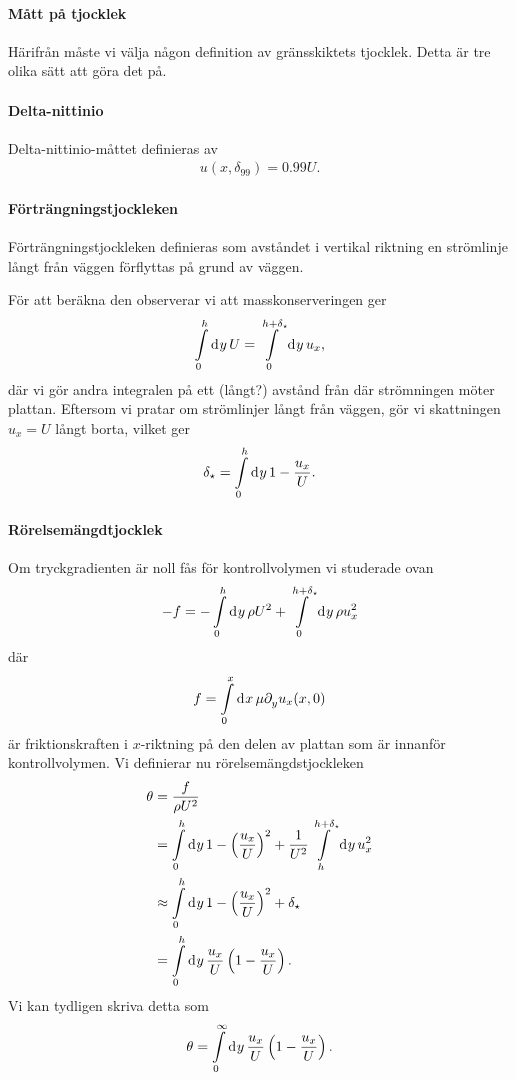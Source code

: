 \paragraph{Mått på tjocklek}
Härifrån måste vi välja någon definition av gränsskiktets tjocklek. Detta är tre olika sätt att göra det på.

\paragraph{Delta-nittinio}
Delta-nittinio-måttet definieras av
\begin{align*}
	u(x, \delta_{99}) = 0.99U.
\end{align*}

\paragraph{Förträngningstjockleken}
Förträngningstjockleken definieras som avståndet i vertikal riktning en strömlinje långt från väggen förflyttas på grund av väggen.

För att beräkna den observerar vi att masskonserveringen ger
\begin{align*}
	\int\limits_{0}^{h}\dd[]{y}U = \int\limits_{0}^{h + \delta_{\star}}\dd[]{y}u_{x},
\end{align*}
där vi gör andra integralen på ett (långt?) avstånd från där strömningen möter plattan. Eftersom vi pratar om strömlinjer långt från väggen, gör vi skattningen $u_{x} = U$ långt borta, vilket ger
\begin{align*}
	\delta_{\star} = \int\limits_{0}^{h}\dd[]{y}1 - \frac{u_{x}}{U}.
\end{align*}

\paragraph{Rörelsemängdtjocklek}
Om tryckgradienten är noll fås för kontrollvolymen vi studerade ovan
\begin{align*}
	-f = -\int\limits_{0}^{h}\dd[]{y}\rho U^{2} + \int\limits_{0}^{h + \delta_{\star}}\dd[]{y}\rho u_{x}^{2}
\end{align*}
där
\begin{align*}
	f = \int\limits_{0}^{x}\dd[]{x}\mu\partial_{y}^{}u_{x}(x, 0)
\end{align*}
är friktionskraften i $x$-riktning på den delen av plattan som är innanför kontrollvolymen. Vi definierar nu rörelsemängdstjockleken
\begin{align*}
	\theta &= \frac{f}{\rho U^{2}} \\
	       &= \int\limits_{0}^{h}\dd[]{y}1 - \left(\frac{u_{x}}{U}\right)^{2} + \frac{1}{U^{2}}\int\limits_{h}^{h + \delta_{\star}}\dd[]{y}u_{x}^{2} \\
	       &\approx \int\limits_{0}^{h}\dd[]{y}1 - \left(\frac{u_{x}}{U}\right)^{2} + \delta_{\star} \\
	       &= \int\limits_{0}^{h}\dd[]{y}\frac{u_{x}}{U}\left( 1 - \frac{u_{x}}{U}\right).
\end{align*}
Vi kan tydligen skriva detta som
\begin{align*}
	\theta = \int\limits_{0}^{\infty}\dd[]{y}\frac{u_{x}}{U}\left( 1 - \frac{u_{x}}{U}\right).
\end{align*}

